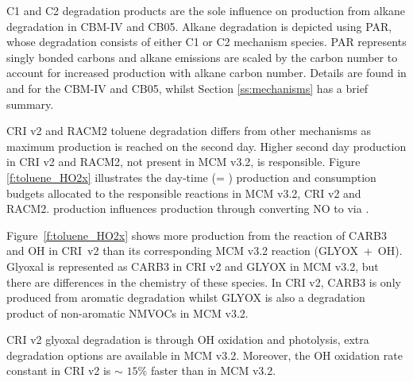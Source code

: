 C1 and C2 degradation products are the sole influence on  production from alkane degradation in CBM-IV and CB05.
Alkane degradation is depicted using PAR, whose degradation consists of either C1 or C2 mechanism species.
PAR represents singly bonded carbons and alkane emissions are scaled by the carbon number to account for increased  production with alkane carbon number.
Details are found in \citet{Hogo:1989} and \citet{Yarwood:2005} for the CBM-IV and CB05, whilst Section \ref{ss:mechanisms} has a brief summary.

CRI v2 and RACM2 toluene degradation differs from other mechanisms as maximum  production is reached on the second day. 
Higher second day  production in CRI v2 and RACM2, not present in MCM v3.2, is responsible.  
Figure \ref{f:toluene_HO2x} illustrates the day-time  (= ) production and consumption budgets allocated to the responsible reactions in MCM v3.2, CRI v2 and RACM2. 
 production influences  production through  converting NO to  via .

\mbox{Figure \ref{f:toluene_HO2x}} shows more  production from the reaction of CARB3 and OH in \mbox{CRI v2} than its corresponding MCM v3.2 reaction (\mbox{GLYOX + OH}).  
Glyoxal is represented as CARB3 in CRI v2 and GLYOX in MCM v3.2, but there are differences in the chemistry of these species.
In CRI v2, CARB3 is only produced from aromatic degradation whilst GLYOX is also a degradation product of non-aromatic NMVOCs in MCM v3.2. 

CRI v2 glyoxal degradation is through OH oxidation and photolysis, extra degradation options are available in MCM v3.2. 
Moreover, the OH oxidation rate constant in CRI v2 is $\sim$ $15$\% faster than in MCM v3.2. 

